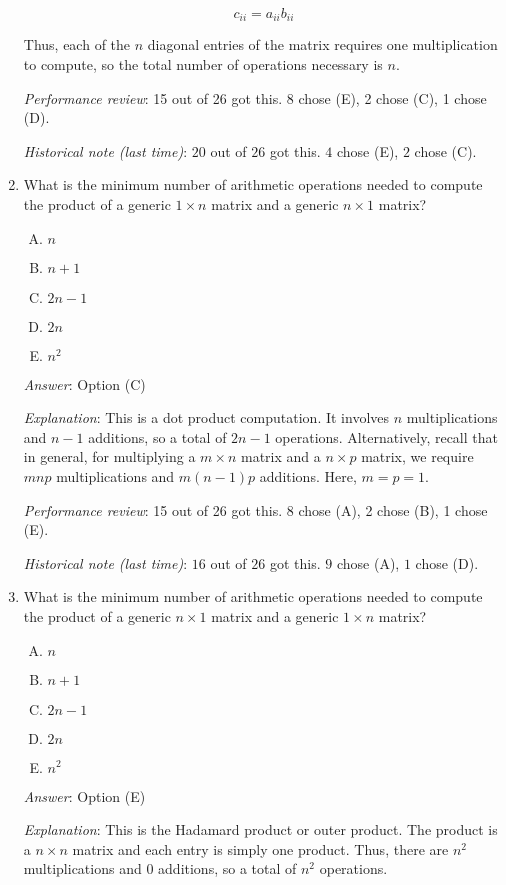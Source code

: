 \documentclass[10pt]{amsart}
\begin{document}
\begin{enumerate}
  $$c_{ii} = a_{ii}b_{ii}$$

  Thus, each of the $n$ diagonal entries of the matrix requires one
  multiplication to compute, so the total number of operations
  necessary is $n$.

  {\em Performance review}: 15 out of 26 got this. 8 chose (E),
  2 chose (C), 1 chose (D).

  {\em Historical note (last time)}: $20$ out of $26$ got this. $4$
  chose (E), $2$ chose (C).
\item What is the minimum number of arithmetic operations needed to
  compute the product of a generic $1 \times n$ matrix and a generic
  $n \times 1$ matrix?

  \begin{enumerate}[(A)]
  \item $n$
  \item $n + 1$
  \item $2n - 1$
  \item $2n$
  \item $n^2$
  \end{enumerate}

  {\em Answer}: Option (C)

  {\em Explanation}: This is a dot product computation. It involves
  $n$ multiplications and $n - 1$ additions, so a total of $2n - 1$
  operations. Alternatively, recall that in general, for multiplying a
  $m \times n$ matrix and a $n \times p$ matrix, we require $mnp$
  multiplications and $m(n -1)p$ additions. Here, $m = p = 1$.

  {\em Performance review}: 15 out of 26 got this. 8 chose (A),
  2 chose (B), 1 chose (E).

  {\em Historical note (last time)}: $16$ out of $26$ got this. $9$
  chose (A), $1$ chose (D).
\item What is the minimum number of arithmetic operations needed to
  compute the product of a generic $n \times 1$ matrix and a generic
  $1 \times n$ matrix?

  \begin{enumerate}[(A)]
  \item $n$
  \item $n + 1$
  \item $2n - 1$
  \item $2n$
  \item $n^2$
  \end{enumerate}

  {\em Answer}: Option (E)

  {\em Explanation}: This is the Hadamard product or outer
  product. The product is a $n \times n$ matrix and each entry is
  simply one product. Thus, there are $n^2$ multiplications and $0$
  additions, so a total of $n^2$ operations.


\end{enumerate}
\end{document}
